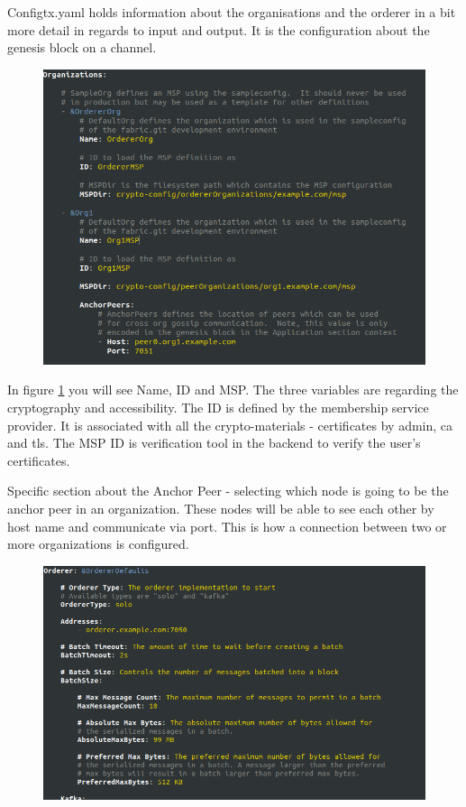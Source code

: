 \documentclass[a4paper,11pt]{report}
\begin{document}
Configtx.yaml holds information about the organisations and the orderer in a bit more detail in regards to input and output. It is the configuration about the genesis block on a channel. 

\begin{figure}[h]
\centering
  \includegraphics[width = 16cm]{configtx1.png}
  \caption{ }
  \label{configtx1}
\end{figure}

In figure \ref{configtx1} you will see Name, ID and MSP. The three variables are regarding the cryptography and accessibility. The ID is defined by the membership service provider. It is associated with all the crypto-materials - certificates by admin, ca and tls. The MSP ID is verification tool in the backend to verify the user’s certificates.
  
Specific section about the Anchor Peer - selecting which node is going to be the anchor peer in an organization. These nodes will be able to see each other by host name and communicate via port. This is how a connection between two or more organizations is configured. 

\begin{figure}[h]
\centering
  \includegraphics[width = 16cm]{configtx2.png}
  \caption{ }
  \label{configtx2}
\end{figure}
\end{document}
